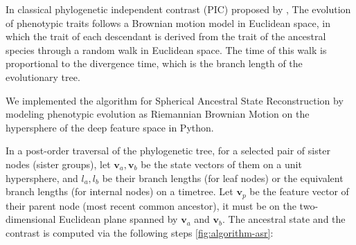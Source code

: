 In classical phylogenetic independent contrast (PIC) proposed by
\textcite{Felsenstein1985PIC}, The evolution of phenotypic traits
follows a Brownian motion model in Euclidean space, in which the trait of each descendant
is derived from the trait of the ancestral species through a random walk in Euclidean space.
The time of this walk is proportional to the divergence time, which is the branch length of
the evolutionary tree.

We implemented the algorithm for Spherical Ancestral State Reconstruction by modeling
phenotypic evolution as Riemannian Brownian Motion on the hypersphere of
the deep feature space in Python.



In a post-order traversal of the phylogenetic tree, for a selected pair
of sister nodes (sister groups), let $\mathbf{v}_a, \mathbf{v}_b$
be the state vectors of them on a unit hypersphere, and $l_a, l_b$ be their branch
lengths (for leaf nodes) or the equivalent branch lengths (for internal nodes)
on a timetree. Let $\mathbf{v}_p$ be the feature vector of their parent node
(most recent common ancestor), it must be on the two-dimensional Euclidean plane spanned
by $\mathbf{v}_a$ and $\mathbf{v}_b$. The ancestral state and the contrast is computed
via the following steps \cref{fig:algorithm-asr}:

